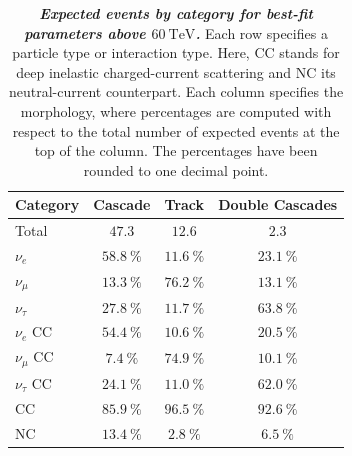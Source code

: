 \begin{table}[h!]
	\begin{minipage}{\linewidth}
		\begin{tabular}{l | c c c}
			\toprule
			Category & Cascade & Track & Double Cascades \\ 
			\midrule
			Total & $47.3$ & $12.6$ & $2.3$ \\ 
			\midrule
			$\nu_e$ & $\SI{58.8}\percent$ & $\SI{11.6}\percent$ & $\SI{23.1}\percent$ \\ 
			$\nu_\mu$ & $\SI{13.3}\percent$ & $\SI{76.2}\percent$ & $\SI{13.1}\percent$ \\ 
			$\nu_\tau$ & $\SI{27.8}\percent$ & $\SI{11.7}\percent$ & $\SI{63.8}\percent$ \\ 
			\midrule
			$\nu_e$ CC & $\SI{54.4}\percent$ & $\SI{10.6}\percent$ & $\SI{20.5}\percent$ \\ 
			$\nu_\mu$ CC & $\SI{7.4}\percent$ & $\SI{74.9}\percent$ & $\SI{10.1}\percent$ \\ 
			$\nu_\tau$ CC & $\SI{24.1}\percent$ & $\SI{11.0}\percent$ & $\SI{62.0}\percent$ \\ 
			\midrule
			CC & $\SI{85.9}\percent$ & $\SI{96.5}\percent$ & $\SI{92.6}\percent$ \\ 
			NC & $\SI{13.4}\percent$ & $\SI{2.8}\percent$ & $\SI{6.5}\percent$ \\
			\bottomrule
		\end{tabular}
	\end{minipage}
	\begin{minipage}{\linewidth}
		\internallinenumbers
		\caption{\textbf{\textit{Expected events by category for best-fit parameters above $\SI{60}\TeV$.}} Each row specifies a particle type or interaction type. Here, CC stands for deep inelastic charged-current scattering and NC its neutral-current counterpart. Each column specifies the morphology, where percentages are computed with respect to the total number of expected events at the top of the column. The percentages have been rounded to one decimal point.}
		\label{tbl:misid}
	\end{minipage}
\end{table}


